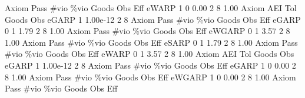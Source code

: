 {\smallskip}
{\smallskip}
       Axiom {\VBAR} Pass        \#vio        \%vio       Goods         Obs         Eff  
       eWARP {\VBAR}    1           0        0.00           2           8        1.00  
{\smallskip}
       Axiom {\VBAR}       AEI        Tol      Goods        Obs 
       eGARP {\VBAR}         1   1.00e-12          2          8 
{\smallskip}
{\smallskip}
{\smallskip}
       Axiom {\VBAR} Pass        \#vio        \%vio       Goods         Obs         Eff  
       eGARP {\VBAR}    0           1        1.79           2           8        1.00  
{\smallskip}
{\smallskip}
{\smallskip}
       Axiom {\VBAR} Pass        \#vio        \%vio       Goods         Obs         Eff  
      eWGARP {\VBAR}    0           1        3.57           2           8        1.00  
{\smallskip}
{\smallskip}
{\smallskip}
       Axiom {\VBAR} Pass        \#vio        \%vio       Goods         Obs         Eff  
       eSARP {\VBAR}    0           1        1.79           2           8        1.00  
{\smallskip}
{\smallskip}
{\smallskip}
       Axiom {\VBAR} Pass        \#vio        \%vio       Goods         Obs         Eff  
       eWARP {\VBAR}    0           1        3.57           2           8        1.00  
{\smallskip}
       Axiom {\VBAR}       AEI        Tol      Goods        Obs 
       eGARP {\VBAR}         1   1.00e-12          2          8 
{\smallskip}
{\smallskip}
{\smallskip}
       Axiom {\VBAR} Pass        \#vio        \%vio       Goods         Obs         Eff  
       eGARP {\VBAR}    1           0        0.00           2           8        1.00  
{\smallskip}
{\smallskip}
{\smallskip}
       Axiom {\VBAR} Pass        \#vio        \%vio       Goods         Obs         Eff  
      eWGARP {\VBAR}    1           0        0.00           2           8        1.00  
{\smallskip}
{\smallskip}
{\smallskip}
       Axiom {\VBAR} Pass        \#vio        \%vio       Goods         Obs         Eff  
